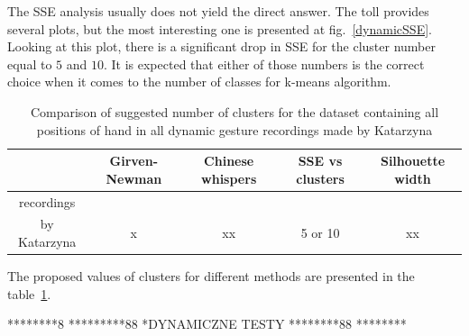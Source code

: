 The SSE analysis usually does not yield the direct answer.
The toll provides several plots, but the most interesting one is presented at fig.~\ref{dynamicSSE}. 
Looking at this plot, there is a significant drop in SSE for the cluster number equal to $5$ and $10$.
It is expected that either of those numbers is the correct choice when it comes to the number of classes for k-means algorithm.



\begin{table}[ht]
 \caption{Comparison of suggested number of clusters for the dataset containing all positions of hand in all dynamic gesture recordings made by Katarzyna}
 \label{clusterwyn}
    \begin{tabular}{ccccc}
    \hline
     & Girven-Newman & Chinese whispers   & SSE vs clusters & Silhouette width  \\ \hline
    recordings \\by Katarzyna          & x      & xx & 5 or 10     & xx     \\ \hline
    \end{tabular}
\end{table}

The proposed values of clusters for different methods are presented in the table~\ref{clusterwyn}.



********8
*********88
*DYNAMICZNE TESTY
********88
********



